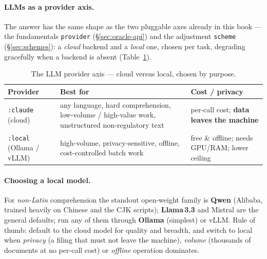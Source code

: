\documentclass[11pt,a4paper]{report}
\begin{document}
\paragraph{LLMs as a provider axis.} The answer has the same shape as the two pluggable axes already in this
book --- the fundamentals \texttt{provider} (\S\ref{sec:oracle-api}) and the adjustment \texttt{scheme}
(\S\ref{sec:schemes}): a \emph{cloud} backend and a \emph{local} one, chosen per task, degrading gracefully
when a backend is absent (Table~\ref{tab:llm-providers}).

\begin{table}[h]
\centering\small
\caption{The LLM provider axis --- cloud versus local, chosen by purpose.}
\label{tab:llm-providers}
\begin{tabular}{@{}lp{}p{}@{}}
\toprule
\textbf{Provider} & \textbf{Best for} & \textbf{Cost / privacy} \\
\midrule
\texttt{:claude} (cloud) & any language, hard comprehension, low-volume / high-value work, unstructured non-regulatory text & per-call cost; \textbf{data leaves the machine} \\
\texttt{:local} (Ollama / vLLM) & high-volume, privacy-sensitive, offline, cost-controlled batch work & free \& offline; needs GPU/RAM; lower ceiling \\
\bottomrule
\end{tabular}
\end{table}

\paragraph{Choosing a local model.} For \emph{non-Latin} comprehension the standout open-weight family is
\textbf{Qwen} (Alibaba, trained heavily on Chinese and the CJK scripts); \textbf{Llama\,3.3} and Mistral are
the general defaults; run any of them through \textbf{Ollama} (simplest) or vLLM. Rule of thumb: default to
the cloud model for quality and breadth, and switch to local when \emph{privacy} (a filing that must not
leave the machine), \emph{volume} (thousands of documents at no per-call cost) or \emph{offline} operation
dominates.
\end{document}
